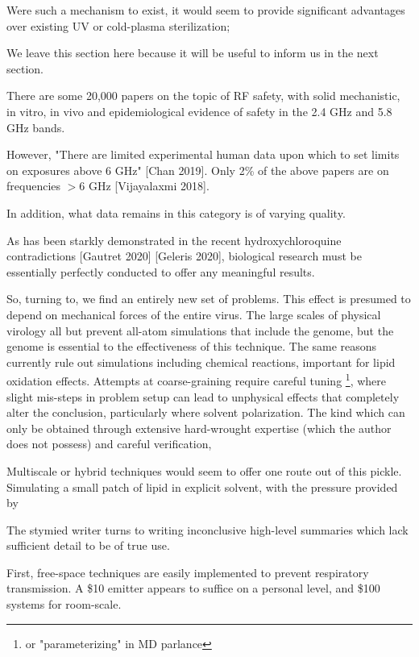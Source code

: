 \documentclass[paper.tex]{subfiles}
\begin{document}
\begin{multicols}{1}
Were such a mechanism to exist, it would seem to provide significant advantages over existing UV or cold-plasma sterilization; 


We leave this section here because it will be useful to inform us in the next section.





There are some 20,000 papers on the topic of RF safety, with solid mechanistic, in vitro, in vivo and epidemiological evidence of safety in the 2.4 GHz and 5.8 GHz bands.

However, "There are limited experimental human data upon which to set limits on exposures above 6 GHz" [Chan 2019]. Only 2\% of the above papers are on frequencies $>6$ GHz [Vijayalaxmi 2018]. 

In addition, what data remains in this category is of varying quality. 



As has been starkly demonstrated in the recent hydroxychloroquine contradictions [Gautret 2020] [Geleris 2020], biological research must be essentially perfectly conducted to offer any meaningful results.

So, turning to, we find an entirely new set of problems. This effect is presumed to depend on mechanical forces of the entire virus. The large scales of physical virology all but prevent all-atom simulations that include the genome, but the genome is essential to the effectiveness of this technique. The same reasons currently rule out simulations including chemical reactions, important for lipid oxidation effects. Attempts at coarse-graining require careful tuning \footnote{or "parameterizing" in MD parlance}, where slight mis-steps in problem setup can lead to unphysical effects that completely alter the conclusion, particularly where solvent polarization. The kind which can only be obtained through extensive hard-wrought expertise (which the author does not possess) and careful verification, 

Multiscale or hybrid techniques would seem to offer one route out of this pickle. Simulating a small patch of lipid in explicit solvent, with the pressure provided by

The stymied writer turns to writing inconclusive high-level summaries which lack sufficient detail to be of true use.





First, free-space techniques are easily implemented to prevent respiratory transmission. A \$10 emitter appears to suffice on a personal level, and \$100 systems for room-scale.\\



\end{multicols}
\end{document}
